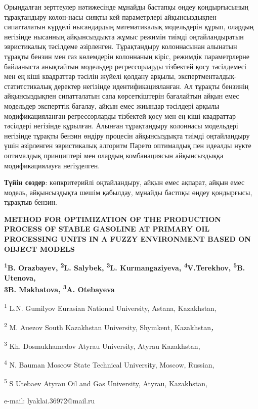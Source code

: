 Орындалған зерттеулер нәтижесінде мұнайды бастапқы өңдеу қондырғысының
тұрақтандыру колон-насы сияқты кей параметрлері айқынсыздықпен
сипатталатын күрделі нысандардың математикалық модельдерін құрып,
олардың негізінде нысанның айқынсыздықта жұмыс режимін тиімді
оңтайландыратын эвристикалық тәсілдеме әзірленген. Тұрақтандыру
колоннасынан алынатын тұрақты бензин мен газ көлемдерін колоннаның
кіріс, режимдік параметрлерне байланыста анықтайтын модельдер
регрессорларды тізбектей қосу тәсілдемесі мен ең кіші квадраттар тәсілін
жүйелі қолдану арқылы, экспертменталдық-статитстикалық деректер
негізінде идентификацияланған. Ал тұрақты бензинің айқынсыздықпен
сипатталатын сапа көрсеткіштерін бағалайтын айқын емес модельдер
эксперттік бағалау, айқын емес жиындар тәсілдері арқылы
модификацияланған регрессорларды тізбектей қосу мен ең кіші квадраттар
тәсілдері негізінде құрылған. Алынған тұрақтандыру колоннасы модельдері
негізінде тұрақты бензин өндіру процесін айқынсыздықта тиімді
оңтайландыру үшін әзірленген эвристикалық алгоритм Парето оптималдық пен
идеалды нүкте оптималдық принциптері мен олардың комбанациясын
айқынсыздыққа модификациялауға негізделген.

{\bfseries Түйін сөздер}: көпкритерийлі оңтайландыру, айқын емес ақпарат,
айқын емес модель, айқынсыздықта шешім қабылдау, мұнайды бастпқы өңдеу
қондырғысы, тұрақтыв бензин.

\begin{center}
{\bfseries METHOD FOR OPTIMIZATION OF THE PRODUCTION PROCESS OF STABLE GASOLINE AT PRIMARY OIL PROCESSING UNITS IN A FUZZY ENVIRONMENT BASED ON OBJECT MODELS}

{\bfseries \textsuperscript{1}B. Orazbayev, \textsuperscript{2}L.
Salybek\envelope, \textsuperscript{3}L. Kurmangaziyeva,
\textsuperscript{4}V.Terekhov, \textsuperscript{5}B. Utenova, \\{3}B. Makhatova, \textsuperscript{3}A.
Otebayeva}

\textsuperscript{1} L.N. Gumilyov Eurasian National University, Astana,
Kazakhstan,

\textsuperscript{2} M. Auezov South Kazakhstan University, Shymkent,
Kazakhstan\emph{{\bfseries ,}}

\textsuperscript{3} Kh. Dosmukhamedov Atyrau University, Atyrau
Kazakhstan,

\textsuperscript{4} N. Bauman Moscow State Technical University, Moscow,
Russian,

\textsuperscript{5} S Utebaev Atyrau Oil and Gas University, Atyrau,
Kazakhstan,

e-mail: lyaklai.36972@mail.ru
\end{center}

